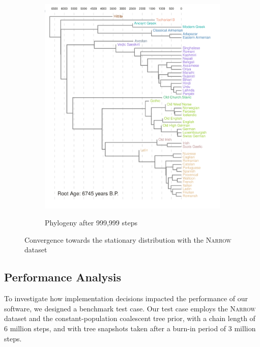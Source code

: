 \documentclass[10pt,journal,compsoc]{IEEEtran}
\begin{document}
\begin{figure}
\begin{subfigure}[b]{0.4\paperwidth}
         \label{fig:convtree3}
     \end{subfigure}
     \hfill
     \begin{subfigure}[b]{0.4\paperwidth}
         \centering
         \caption{Phylogeny after 999,999 steps}
         \includegraphics[width=\textwidth]{runs26-conv4}
         \label{fig:convtree4}
     \end{subfigure}
     \caption{Convergence towards the stationary distribution with the \textsc{Narrow} dataset}
     \label{fig:convtrees}
\end{figure}

\subsection{Performance Analysis}

To investigate how implementation decisions impacted the performance of our software, we designed a benchmark test case. Our test case employs the \textsc{Narrow} dataset and the constant-population coalescent tree prior, with a chain length of 6 million steps, and with tree snapshots taken after a burn-in period of 3 million steps.
\end{document}
